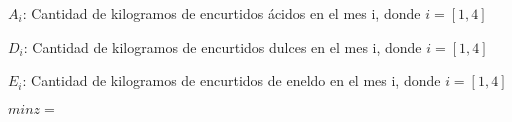 \begin{description}
\item[Variables:]
\item $A_i$: Cantidad de kilogramos de encurtidos ácidos en el mes i, donde $i=[1,4]$
\item $D_i$: Cantidad de kilogramos de encurtidos dulces en el mes i, donde $i=[1,4]$
\item $E_i$: Cantidad de kilogramos de encurtidos de eneldo en el mes i, donde $i=[1,4]$
\end{description}

\begin{description}
\item[Función Objetivo]
\item $min z =$\\
\item 
\end{description}

